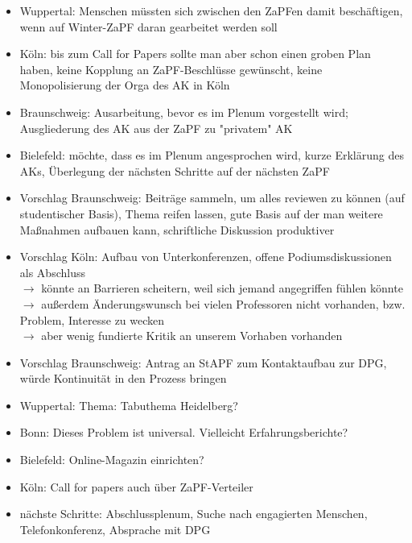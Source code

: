 \begin{itemize}
        \item Wuppertal: Menschen müssten sich zwischen den ZaPFen damit beschäftigen, wenn auf Winter-ZaPF daran gearbeitet werden soll
        \item Köln: bis zum Call for Papers sollte man aber schon einen groben Plan haben, keine Kopplung an ZaPF-Beschlüsse gewünscht, keine Monopolisierung der Orga des AK in Köln
        \item Braunschweig: Ausarbeitung, bevor es im Plenum vorgestellt wird; Ausgliederung des AK aus der ZaPF zu "privatem" AK
        \item Bielefeld: möchte, dass es im Plenum angesprochen wird, kurze Erklärung des AKs, Überlegung der nächsten Schritte auf der nächsten ZaPF
        \item Vorschlag Braunschweig: Beiträge sammeln, um alles reviewen zu können (auf studentischer Basis), Thema reifen lassen, gute Basis auf der man weitere Maßnahmen aufbauen kann, schriftliche Diskussion produktiver
        \item Vorschlag Köln: Aufbau von Unterkonferenzen, offene Podiumsdiskussionen als Abschluss\\
            $ \rightarrow $ könnte an Barrieren scheitern, weil sich jemand angegriffen fühlen könnte\\
           $ \rightarrow $ außerdem Änderungswunsch bei vielen Professoren nicht vorhanden, bzw. Problem, Interesse zu wecken\\
            $ \rightarrow $ aber wenig fundierte Kritik an unserem Vorhaben vorhanden
        \item Vorschlag Braunschweig: Antrag an StAPF zum Kontaktaufbau zur DPG, würde Kontinuität in den Prozess bringen
        \item Wuppertal: Thema: Tabuthema Heidelberg?
        \item Bonn: Dieses Problem ist universal. Vielleicht Erfahrungsberichte?
        \item Bielefeld: Online-Magazin einrichten?
        \item Köln: Call for papers auch über ZaPF-Verteiler
        \item nächste Schritte: Abschlussplenum, Suche nach engagierten Menschen, Telefonkonferenz, Absprache mit DPG
      \end{itemize}

